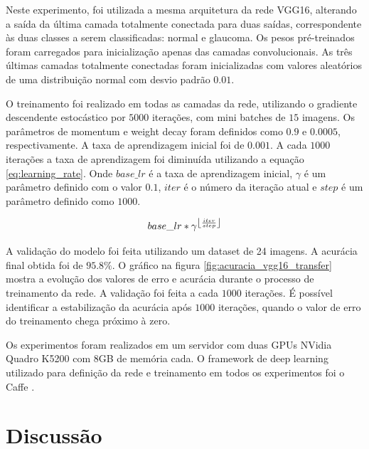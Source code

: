 \documentclass[conference]{IEEEtran}
\DeclarePairedDelimiter\floor{\lfloor}{\rfloor}
\begin{document}
  Neste experimento, foi utilizada a mesma arquitetura da rede VGG16, alterando a saída da última camada totalmente conectada para duas saídas, correspondente às duas classes a serem classificadas: normal e glaucoma. Os pesos pré-treinados foram carregados para inicialização apenas das camadas convolucionais. As três últimas camadas totalmente conectadas foram inicializadas com valores aleatórios de uma distribuição normal com desvio padrão $0.01$. %
  
  O treinamento foi realizado em todas as camadas da rede, utilizando o gradiente descendente estocástico por $5000$ iterações, com mini batches de $15$ imagens. Os parâmetros de momentum e weight decay foram definidos como $0.9$ e $0.0005$, respectivamente. A taxa de aprendizagem inicial foi de $0.001$. A cada $1000$ iterações a taxa de aprendizagem foi diminuída utilizando a equação \ref{eq:learning_rate}. Onde $base\_lr$ é a taxa de aprendizagem inicial, $\gamma$ é um parâmetro definido com o valor $0.1$, $iter$ é o número da iteração atual e $step$ é um parâmetro definido como $1000$.

  \begin{equation}
    base\_lr * \gamma^{\floor*{\frac{iter}{step}}}
    \label{eq:learning_rate}
  \end{equation}

  A validação do modelo foi feita utilizando um dataset de 24 imagens. A acurácia final obtida foi de $95.8\%$. O gráfico na figura \ref{fig:acuracia_vgg16_transfer} mostra a evolução dos valores de erro e acurácia durante o processo de treinamento da rede. A validação foi feita a cada $1000$ iterações. É possível identificar a estabilização da acurácia após $1000$ iterações, quando o valor de erro do treinamento chega próximo à zero.

  Os experimentos foram realizados em um servidor com duas GPUs NVidia Quadro K5200 com 8GB de memória cada. O framework de deep learning utilizado para definição da rede e treinamento em todos os experimentos foi o Caffe \cite{jia2014caffe}.

\section{Discussão}
\end{document}
